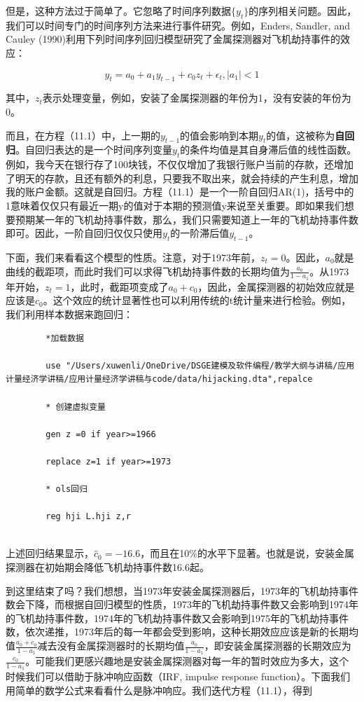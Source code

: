 \documentclass[cn,12pt,math=newtx,citestyle=gb7714-2015,bibstyle=gb7714-2015]{elegantbook}
\begin{document}
	但是，这种方法过于简单了。它忽略了时间序列数据$\{y_t\}$的序列相关问题。因此，我们可以时间专门的时间序列方法来进行事件研究。例如，Enders, Sandler, and Cauley (1990)利用下列时间序列回归模型研究了金属探测器对飞机劫持事件的效应：
	
	\begin{equation}
		y_t = a_0 +a_1 y_{t-1} +c_0 z_t +\epsilon_t, |a_1|<1
	\end{equation}
	
	其中，$z_t$表示处理变量，例如，安装了金属探测器的年份为1，没有安装的年份为0。
	
	而且，在方程（11.1）中，上一期的$y_{t-1}$的值会影响到本期$y_t$的值，这被称为\textbf{自回归}。自回归表达的是一个时间序列变量$y_t$的条件均值是其自身滞后值的线性函数。例如，我今天在银行存了100块钱，不仅仅增加了我银行账户当前的存款，还增加了明天的存款，且还有额外的利息，只要我不取出来，就会持续的产生利息，增加我的账户金额。这就是自回归。方程（11.1）是一个一阶自回归AR(1)，括号中的1意味着仅仅只有最近一期y的值对于本期的预测值y来说至关重要。即如果我们想要预期某一年的飞机劫持事件数，那么，我们只需要知道上一年的飞机劫持事件数即可。因此，一阶自回归仅仅只使用$y_t$的一阶滞后值$y_{t-1}$。
	
	下面，我们来看看这个模型的性质。注意，对于1973年前，$z_t=0$。因此，$a_0$就是曲线的截距项，而此时我们可以求得飞机劫持事件数的长期均值为$\frac{a_0}{1-a_1}$。从1973年开始，$z_t=1$，此时，截距项变成了$a_0+c_0$，因此，金属探测器的初始效应就是应该是$c_0$。这个效应的统计显著性也可以利用传统的t统计量来进行检验。例如，我们利用样本数据来跑回归：
	
	\begin{lstlisting}
		*加载数据
		
		use "/Users/xuwenli/OneDrive/DSGE建模及软件编程/教学大纲与讲稿/应用计量经济学讲稿/应用计量经济学讲稿与code/data/hijacking.dta",repalce
		
		* 创建虚拟变量
		
		gen z =0 if year>=1966
		
		replace z=1 if year>=1973
		
		* ols回归
		
		reg hji L.hji z,r
		
	\end{lstlisting}
	
	上述回归结果显示，$\hat{c}_0=-16.6$，而且在10\%的水平下显著。也就是说，安装金属探测器在初始期会降低飞机劫持事件数16.6起。
	
	到这里结束了吗？我们想想，当1973年安装金属探测器后，1973年的飞机劫持事件数会下降，而根据自回归模型的性质，1973年的飞机劫持事件数又会影响到1974年的飞机劫持事件数，1974年的飞机劫持事件数又会影响到1975年的飞机劫持事件数，依次递推，1973年后的每一年都会受到影响，这种长期效应应该是新的长期均值$\frac{a_0+c_0}{1-a_1}$减去没有金属探测器时的长期均值$\frac{a_0}{1-a_1}$，即安装金属探测器的长期效应为$\frac{c_0}{1-a_1}$。可能我们更感兴趣地是安装金属探测器对每一年的暂时效应为多大，这个时候我们可以借助于脉冲响应函数（IRF, impulse response function）。下面我们用简单的数学公式来看看什么是脉冲响应。我们迭代方程（11.1），得到
	
\end{document}
